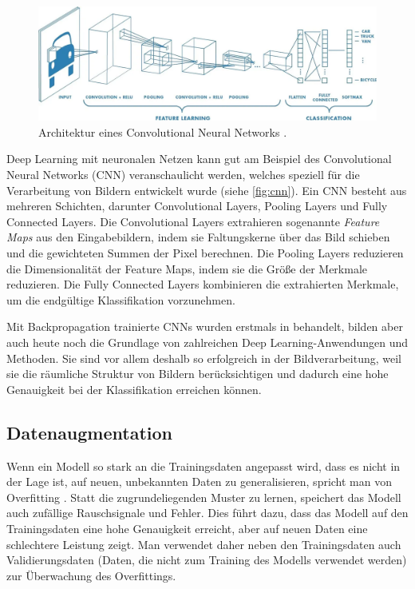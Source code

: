 \begin{figure}[h]
	\centering
	\includegraphics[width=\textwidth]{figure_cnn.png}
	\caption[Architektur eines Convolutional Neural Networks.]{Architektur eines Convolutional Neural Networks \parencite{Saha2018cnnfigure}.}
	\label{fig:cnn}
\end{figure}

Deep Learning mit neuronalen Netzen kann gut am Beispiel des Convolutional Neural Networks (CNN) veranschaulicht werden, welches speziell für die Verarbeitung von Bildern entwickelt wurde (siehe \autoref{fig:cnn}). Ein CNN besteht aus mehreren Schichten, darunter Convolutional Layers, Pooling Layers und Fully Connected Layers. Die Convolutional Layers extrahieren sogenannte \emph{Feature Maps} aus den Eingabebildern, indem sie Faltungskerne über das Bild schieben und die gewichteten Summen der Pixel berechnen. Die Pooling Layers reduzieren die Dimensionalität der Feature Maps, indem sie die Größe der Merkmale reduzieren. Die Fully Connected Layers kombinieren die extrahierten Merkmale, um die endgültige Klassifikation vorzunehmen.

Mit Backpropagation trainierte CNNs wurden erstmals in \parencite{LeCun1990cnnbackprop} behandelt, bilden aber auch heute noch die Grundlage von zahlreichen Deep Learning-Anwendungen und Methoden. Sie sind vor allem deshalb so erfolgreich in der Bildverarbeitung, weil sie die räumliche Struktur von Bildern berücksichtigen und dadurch eine hohe Genauigkeit bei der Klassifikation erreichen können.

\subsection{Datenaugmentation} \label{subsec:data-augmentation}

Wenn ein Modell so stark an die Trainingsdaten angepasst wird, dass es nicht in der Lage ist, auf neuen, unbekannten Daten zu generalisieren, spricht man von Overfitting \parencite{Goodfellow2016deeplearning}. Statt die zugrundeliegenden Muster zu lernen, speichert das Modell auch zufällige Rauschsignale und Fehler. Dies führt dazu, dass das Modell auf den Trainingsdaten eine hohe Genauigkeit erreicht, aber auf neuen Daten eine schlechtere Leistung zeigt. Man verwendet daher neben den Trainingsdaten auch Validierungsdaten (Daten, die nicht zum Training des Modells verwendet werden) zur Überwachung des Overfittings.

